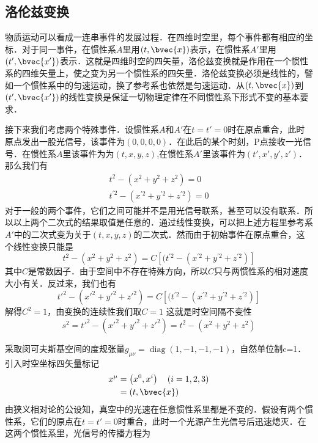 

\subsection{洛伦兹变换}
\begin{definition}{}
物质运动可以看成一连串事件的发展过程．在四维时空里，每个事件都有相应的坐标．对于同一事件，在惯性系$A$里用$(t, \bvec{x})$表示，在惯性系$A'$里用$(t', \bvec{x'})$表示．这就是四维时空的四矢量，洛伦兹变换就是作用在一个惯性系的四维矢量上，使之变为另一个惯性系的四矢量．洛伦兹变换必须是线性的，譬如一个惯性系中的匀速运动，换了参考系也依然是匀速运动．从$(t, \bvec{x})$到$(t', \bvec{x'})$的线性变换是保证一切物理定律在不同惯性系下形式不变的基本要求．

接下来我们考虑两个特殊事件．设惯性系$A$和$A'$在$t=t'=0$时在原点重合，此时原点发出一股光信号，该事件为$(0,0,0,0)$．在此后的某个时刻，P点接收一光信号．在惯性系$A$里该事件为为$(t,x,y,z)$,在惯性系$A'$里该事件为$(t',x',y',z')$．那么我们有
\begin{equation}
\begin{array}{c}
t^{2}-(x^{2}+y^{2}+z^{2})=0 \\
t^{\prime 2}-(x^{\prime 2}+y^{\prime 2}+z^{\prime 2})=0
\end{array}
\end{equation}
对于一般的两个事件，它们之间可能并不是用光信号联系，甚至可以没有联系．所以以上两个二次式的结果取值是任意的．通过线性变换，可以把上述方程里参考系$A'$中的二次式变为关于$(t,x,y,z)$的二次式．然而由于初始事件在原点重合，这个线性变换只能是
\begin{equation}
t^{2}-(x^{2}+y^{2}+z^{2})=C\left[(t^{\prime 2}-(x^{\prime 2}+y^{\prime 2}+z^{\prime 2})\right]
\end{equation}
其中$C$是常数因子．由于空间中不存在特殊方向，所以$C$只与两惯性系的相对速度大小有关．反过来，我们也有
\begin{equation}
t'^{2}-(x'^{2}+y'^{2}+z'^{2})=C\left[(t^{\prime 2}-(x^{\prime 2}+y^{\prime 2}+z^{\prime 2})\right]
\end{equation}
解得$C^2=1$，由变换的连续性我们取$C=1$
这就是时空间隔不变性
\begin{equation}
s^2=t'^{2}-(x'^{2}+y'^{2}+z'^{2})=t^{2}-(x^{2}+y^{2}+z^{2})
\end{equation}

\end{definition}
采取闵可夫斯基空间的度规张量$g_{\mu \nu}=\operatorname{diag}(1,-1,-1,-1)$，自然单位制c=1．引入时空坐标四矢量标记
\begin{equation}
\begin{aligned}
x^{\mu} &=\left(x^{0}, x^{i}\right) \quad(i=1,2,3)\\
&=(t, \bvec{x})
\end{aligned}
\end{equation}
由狭义相对论的公设知，真空中的光速在任意惯性系里都是不变的．假设有两个惯性系，它们的原点在$t=t'=0$时重合，此时一个光源产生光信号后迅速熄灭．在这两个惯性系里，光信号的传播方程为


